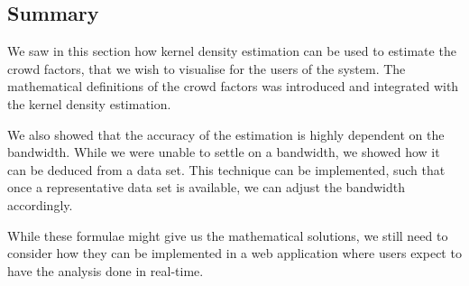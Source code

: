 \subsection{Summary}

We saw in this section how kernel density estimation can be used to estimate the crowd factors, that we wish to visualise for the users of the system. The mathematical definitions of the crowd factors was introduced and integrated with the kernel density estimation.

We also showed that the accuracy of the estimation is highly dependent on the bandwidth. While we were unable to settle on a bandwidth, we showed how it can be deduced from a data set. This technique can be implemented, such that once a representative data set is available, we can adjust the bandwidth accordingly.

While these formulae might give us the mathematical solutions, we still need to consider how they can be implemented in a web application where users expect to have the analysis done in real-time.





